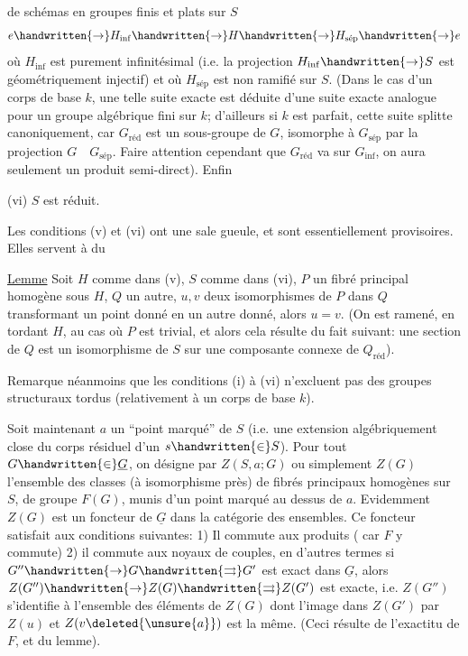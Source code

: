 
de schémas en groupes finis et plats sur $S$
\[
e\handwritten{\to}H_{\mathrm{inf}}\handwritten{\to}H\handwritten{\to}H_{\text{sép}}\handwritten{\to}e
\]
où $H_{\mathrm{inf}}$ est purement infinitésimal (i.e. la projection $H_{\mathrm{inf}}\handwritten{\to}S$
est géométriquement injectif) et où $H_{\text{sép}}$ est non ramifié sur $S$.
(Dans le cas d'un corps de base $k$, une telle suite exacte est
déduite d'une suite exacte analogue pour un groupe algébrique
fini  sur $k$; d'ailleurs si $k$ est parfait, cette suite splitte canoniquement, car $G_{\text{réd}}$ est  un sous-groupe de $G$, isomorphe à $G_{\text{sép}}$ par la
projection $G\quad G_{\text{sép}}$. Faire attention cependant que $G_{\text{réd}}$ va 
sur $G_{\mathrm{inf}}$, on aura seulement un produit semi-direct). Enfin


(vi) $S$ est réduit.

Les conditions (v) et (vi) ont une sale gueule, et sont essentiellement provisoires. Elles servent à   du

\uline{Lemme} Soit $H$ comme dans (v), $S$ comme dans (vi), $P$ un fibré principal homogène sous $H$, $Q$ un autre, $u,v$ deux isomorphismes de $P$ dans $Q$
transformant un point   donné en un autre donné, alors
$u=v$. (On est ramené, en tordant $H$, au cas où $P$ est trivial, et
alors cela résulte du fait suivant: une section de $Q$ est un isomorphisme de $S$ sur une composante connexe de $Q_{\text{réd}}$).

Remarque néanmoins que les conditions (i) à (vi) n'excluent
pas des groupes structuraux tordus (relativement à un corps de base
$k$).

Soit maintenant $a$ un ``point marqué'' de $S$ (i.e. une extension
algébriquement close du corps résiduel d'un $s\handwritten{\in}S$). Pour tout $G\handwritten{\in}\underline G$,
on désigne par $Z(S,a;G)$ ou simplement $Z(G)$ l'ensemble des classes
(à isomorphisme près) de fibrés principaux homogènes sur $S$, de
groupe $F(G)$, munis d'un point marqué au dessus de $a$. Evidemment
$Z(G)$ est un foncteur de $\underline G$ dans la catégorie des ensembles. Ce
foncteur satisfait aux conditions suivantes: 1) Il commute aux
produits ( car $F$ y commute) 2) il commute aux noyaux
de couples, en d'autres termes si $G''\handwritten{\to}G\handwritten{\rightrightarrows}G'$ est exact dans $\underline G$,
alors $Z(G'')\handwritten{\to}Z(G)\handwritten{\rightrightarrows}Z(G')$ est exacte, i.e. $Z(G'')$ s'identifie
à l'ensemble des éléments de $Z(G)$ dont l'image dans $Z(G')$ par $Z(u)$
\deleted{\unsure{(}}et $Z(v\deleted{\unsure{a}})$ est la même. (Ceci résulte de l'exactitu de $F$, et du
lemme). 
